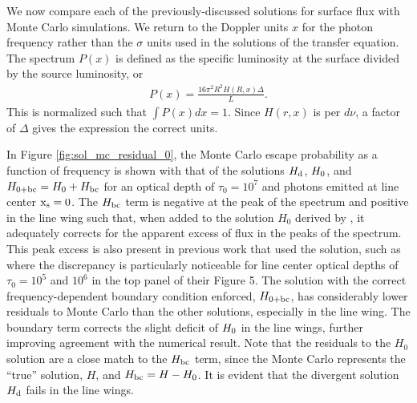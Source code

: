 \documentclass{aastex63}
\newcommand{\be}{\begin{eqnarray}}
\newcommand{\ee}{\end{eqnarray}}
\begin{document}
We now compare each of the previously-discussed solutions for surface flux with Monte Carlo simulations. We return to the Doppler units $x$ for the photon frequency rather than the $\sigma$ units used in the solutions of the transfer equation. The spectrum $P(x)$ is defined as the specific luminosity at the surface divided by the source luminosity, or
\be
P(x) = \frac{16\pi^2R^2H(R, x)\Delta}{L}.
\ee
This is normalized such that $\int P(x)dx = 1$. Since $H(r, x)$ is per $d\nu$, a factor of $\Delta$ gives the expression the correct units. 

In Figure \ref{fig:sol_mc_residual_0}, the Monte Carlo escape probability as a function of frequency is shown with that of the solutions $H_{\rm d}$, $H_{\rm 0}$, and $H_{\rm 0 + bc} = H_{\rm 0} + H_{\rm bc}$ for an optical depth of $\tau_0 = 10^7$ and photons emitted at line center $\rm x_s = 0$.  The $H_{\rm bc}$ term is negative at the peak of the spectrum and positive in the line wing such that, when added to the solution $H_0$ derived by \citet{2006ApJ...649...14D}, it adequately corrects for the apparent excess of flux in the peaks of the spectrum. This peak excess is also present in previous work that used the \citet{1990ApJ...350..216N} solution, such as \citet{2015MNRAS.449.4336S} where the discrepancy is particularly noticeable for line center optical depths of $\tau_0=10^5$ and $10^6$ in the top panel of their Figure 5. The solution with the correct frequency-dependent boundary condition enforced, $H_{\rm 0 + bc}$, has considerably lower residuals to Monte Carlo than the other solutions, especially in the line wing. The boundary term corrects the slight deficit of $H_{\rm0}$ in the line wings, further improving agreement with the numerical result. Note that the residuals to the $H_0$ solution are a close match to the $H_{\rm bc}$ term, since the Monte Carlo represents the ``true'' solution, $H$, and $H_{\rm bc} = H - H_0$. It is evident that the divergent solution $H_{\rm d}$ fails in the line wings.
\end{document}
